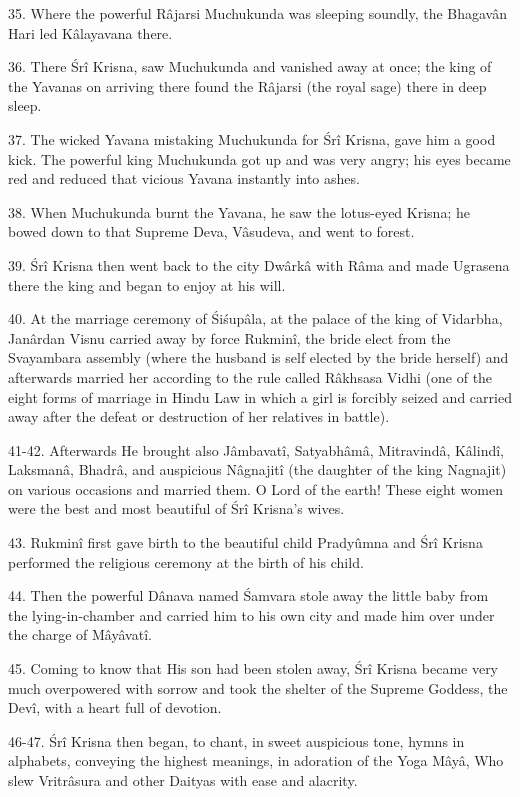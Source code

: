 35. Where the powerful R\^ajarsi Muchukunda was sleeping soundly, the Bhagav\^an Hari led K\^alayavana there.

36. There \'Sr\^i Krisna, saw Muchukunda and vanished away at once; the king of the Yavanas on arriving there found the R\^ajarsi (the royal sage) there in deep sleep.

37. The wicked Yavana mistaking Muchukunda for \'Sr\^i Krisna, gave him a good kick. The powerful king Muchukunda got up and was very angry; his eyes became red and reduced that vicious Yavana instantly into ashes.

38. When Muchukunda burnt the Yavana, he saw the lotus-eyed Krisna; he bowed down to that Supreme Deva, V\^asudeva, and went to forest.

39. \'Sr\^i Krisna then went back to the city Dw\^ark\^a with R\^ama and made Ugrasena there the king and began to enjoy at his will.

40. At the marriage ceremony of \'Si\'sup\^ala, at the palace of the king of Vidarbha, Jan\^ardan Visnu carried away by force Rukmin\^i, the bride elect from the Svayambara assembly (where the husband is self elected by the bride herself) and afterwards married her according to the rule called R\^akhsasa Vidhi (one of the eight forms of marriage in Hindu Law in which a girl is forcibly seized and carried away after the defeat or destruction of her relatives in battle).

41-42. Afterwards He brought also J\^ambavat\^i, Satyabh\^am\^a, Mitravind\^a, K\^alind\^i, Laksman\^a, Bhadr\^a, and auspicious N\^agnajit\^i (the daughter of the king Nagnajit) on various occasions and married them. O Lord of the earth! These eight women were the best and most beautiful of \'Sr\^i Krisna's wives.

43. Rukmin\^i first gave birth to the beautiful child Pradyûmna and \'Sr\^i Krisna performed the religious ceremony at the birth of his child.

44. Then the powerful D\^anava named \'Samvara stole away the little baby from the lying-in-chamber and carried him to his own city and made him over under the charge of M\^ay\^avat\^i.

45. Coming to know that His son had been stolen away, \'Sr\^i Krisna became very much overpowered with sorrow and took the shelter of the Supreme Goddess, the Dev\^i, with a heart full of devotion.

46-47. \'Sr\^i Krisna then began, to chant, in sweet auspicious tone, hymns in alphabets, conveying the highest meanings, in adoration of the Yoga M\^ay\^a, Who slew Vritr\^asura and other Daityas with ease and alacrity.

